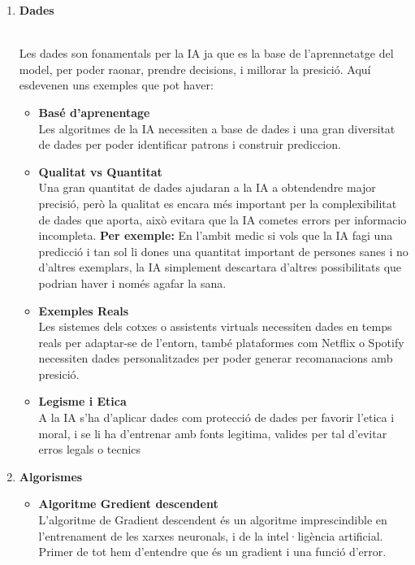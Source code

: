\begin{enumerate}
    \item \hypertarget{Dades}{\textbf{Dades}}\\
    Les dades son fonamentals per la IA ja que es la base de l'aprennetatge del model, per poder raonar, prendre decisions, i millorar la presició. Aquí esdevenen uns exemples que pot haver:
         \begin{itemize}
            \item[] \textbf{Basé d'aprenentage}\\
            Les algoritmes de la IA necessiten a base de dades i una gran diversitat de dades per poder identificar patrons i construir prediccion.

           \item[] \textbf{Qualitat vs Quantitat}\\
            Una gran quantitat de dades ajudaran a la IA a obtendendre major precisió, però la qualitat es encara més important per la complexibilitat de dades que aporta, això evitara que la IA cometes errors per informacio incompleta.\textbf{ Per exemple:} En l'ambit medic si vols que la IA fagi una predicció i tan sol li dones una quantitat important de persones sanes i no d'altres exemplars, la IA simplement descartara d'altres possibilitats que podrian haver i només agafar la sana.

            \item[] \textbf{Exemples Reals}\\
            Les sistemes dels cotxes o assistents virtuals necessiten dades en temps reals per adaptar-se de l'entorn, també plataformes com Netflix o Spotify necessiten dades personalitzades per poder generar recomanacions amb presició.

           \item[] \textbf{Legisme i Etica}\\
            A la IA s'ha d'aplicar dades com protecció de dades per favorir l'etica i moral, i se li ha d'entrenar amb fonts legitima, valides per tal d'evitar erros legals o tecnics
          \end{itemize}

     \item \hypertarget{Algorismes}{\textbf{Algorismes}}
        \begin{itemize}
         \label{Algoritme_gradient}\item[] \textbf{Algoritme Gredient descendent}\\
         L'algoritme de Gradient descendent és un algoritme imprescindible en l'entrenament de les xarxes neuronals, i de la intel·ligència artificial. Primer de tot hem d'entendre que és un gradient i una funció d'error.


\end{itemize}
\end{enumerate}
